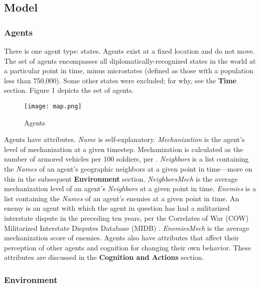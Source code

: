 \documentclass{article}
\begin{document}
\subsection{Model}

\subsubsection{Agents}

There is one agent type: states. Agents exist at a fixed location and do not
move. The set of agents encompasses all diplomatically-recognized 
states in the world at a particular point in time, minus microstates (defined as
those with a population less than 750,000). Some other states were excluded; for
why, see the \textbf{Time}
section. Figure 1 depicts the set of agents.

\begin{figure}[h!]
	\centering
	\caption{Agents}
	\texttt{[image: map.png]}
\end{figure}

Agents have attributes. \textit{Name} is self-explanatory.
\textit{Mechanization} is the agent's level of mechanization at a given
timestep. Mechanization is calculated as the number of armored vehicles per 100
soldiers, per \citet{sechser2010army}. \textit{Neighbors} is a list containing
the \textit{Names} of an agent's geographic neighbors at a given point in
time---more on this in the subsequent \textbf{Environment} section. \textit{NeighborsMech} is the
average mechanization level of an agent's \textit{Neighbors} at a given point in
time. \textit{Enemies} is a list containing the \textit{Names} of an agent's
enemies at a given point in time. An enemy is an agent with which the agent in
question has had a militarized interstate dispute in the preceding ten years,
per the Correlates of War (COW) Militarized Interstate Disputes Database (MIDB)
\citep{cow_midb}. \textit{EnemiesMech} is the average mechanization score of
enemies. Agents also have attributes that affect their
perception of other agents and cognition for changing their own behavior. These
attributes are discussed in the \textbf{Cognition and Actions} section.


\subsubsection{Environment}
\end{document}
